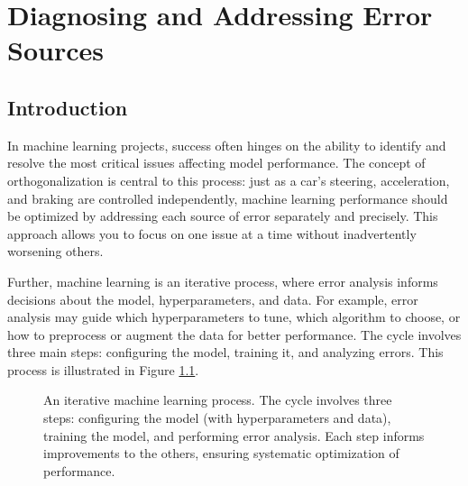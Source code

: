 \documentclass[12pt,openany]{book}
\begin{document}
\chapter{Diagnosing and Addressing Error Sources}

\section*{Introduction}

In machine learning projects, success often hinges on the ability to identify and resolve the most critical issues affecting model performance. The concept of orthogonalization is central to this process: just as a car’s steering, acceleration, and braking are controlled independently, machine learning performance should be optimized by addressing each source of error separately and precisely. This approach allows you to focus on one issue at a time without inadvertently worsening others. \newline

Further, machine learning is an iterative process, where error analysis informs decisions about the model, hyperparameters, and data. For example, error analysis may guide which hyperparameters to tune, which algorithm to choose, or how to preprocess or augment the data for better performance. The cycle involves three main steps: configuring the model, training it, and analyzing errors. This process is illustrated in Figure \ref{fig:ml_cycle}. \newline

\begin{figure}[h!]
\centering
{}
\caption{An iterative machine learning process. The cycle involves three steps: configuring the model (with hyperparameters and data), training the model, and performing error analysis. Each step informs improvements to the others, ensuring systematic optimization of performance.}
\label{fig:ml_cycle}
\end{figure}
\end{document}
